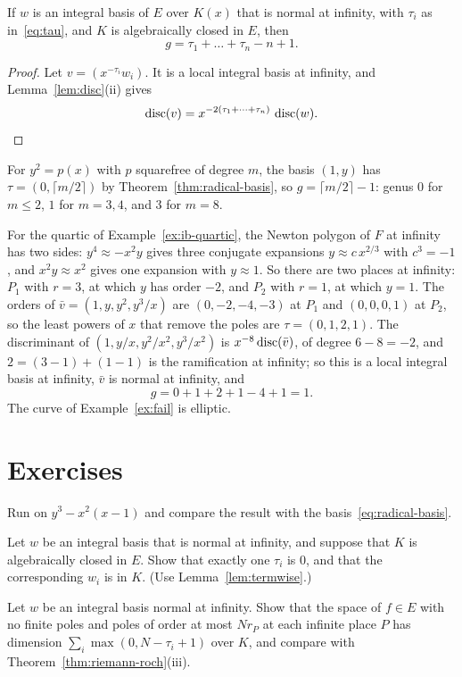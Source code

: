 \begin{corollary}\label{cor:genus-tau}
If $w$ is an integral basis of $E$ over $K(x)$ that is normal at infinity,
with $\tau_i$ as in~\eqref{eq:tau}, and $K$ is algebraically closed in $E$,
then
\[
  g = \tau_1 + \dots + \tau_n - n + 1 .
\]
\end{corollary}

\begin{proof}
Let $v = (x^{-\tau_i} w_i)$. It is a local integral basis at infinity, and
Lemma~\ref{lem:disc}(ii) gives
\[
  \operatorname{disc}(v) = x^{-2 (\tau_1 + \dots + \tau_n)}\, \operatorname{disc}(w) . \qedhere
\]
\end{proof}

\begin{example}\label{ex:genus}
For $y^2 = p(x)$ with $p$ squarefree of degree $m$, the basis $(1, y)$ has
$\tau = (0, \lceil m/2 \rceil)$ by Theorem~\ref{thm:radical-basis}, so $g =
\lceil m/2 \rceil - 1$: genus $0$ for $m \le 2$, $1$ for $m = 3, 4$, and $3$
for $m = 8$.

For the quartic of Example~\ref{ex:ib-quartic}, the Newton polygon of $F$ at
infinity has two sides: $y^4 \approx -x^2 y$ gives three conjugate expansions
$y \approx c\,x^{2/3}$ with $c^3 = -1$, and $x^2 y \approx x^2$ gives one
expansion with $y \approx 1$. So there are two places at infinity: $P_1$
with $r = 3$, at which $y$ has order $-2$, and $P_2$ with $r = 1$, at which $y
= 1$. The orders of $\bar v = (1, y, y^2, y^3/x)$ are $(0,
-2, -4, -3)$ at $P_1$ and $(0, 0, 0, 1)$ at $P_2$, so the least powers of $x$
that remove the poles are $\tau = (0, 1, 2, 1)$. The discriminant of $(1,
y/x, y^2/x^2, y^3/x^2)$ is $x^{-8} \operatorname{disc}(\bar v)$, of degree $6 - 8 = -2$,
and $2 = (3 - 1) + (1 - 1)$ is the ramification at infinity; so this is a
local integral basis at infinity, $\bar v$ is normal at infinity, and
\[
  g = 0 + 1 + 2 + 1 - 4 + 1 = 1 .
\]
The curve of Example~\ref{ex:fail} is elliptic.
\end{example}

\section*{Exercises}

\begin{exercise}
Run  on $y^3 - x^2 (x - 1)$ and compare the result with
the basis~\eqref{eq:radical-basis}.
\end{exercise}

\begin{exercise}
Let $w$ be an integral basis that is normal at infinity, and suppose that
$K$ is algebraically closed in $E$. Show that exactly one $\tau_i$ is $0$,
and that the corresponding $w_i$ is in $K$. (Use Lemma~\ref{lem:termwise}.)
\end{exercise}

\begin{exercise}
Let $w$ be an integral basis normal at infinity. Show that the space of
$f \in E$ with no finite poles and poles of order at most $N r_P$ at each
infinite place $P$ has dimension $\sum_i \max(0, N - \tau_i + 1)$ over $K$,
and compare with Theorem~\ref{thm:riemann-roch}(iii).
\end{exercise}
